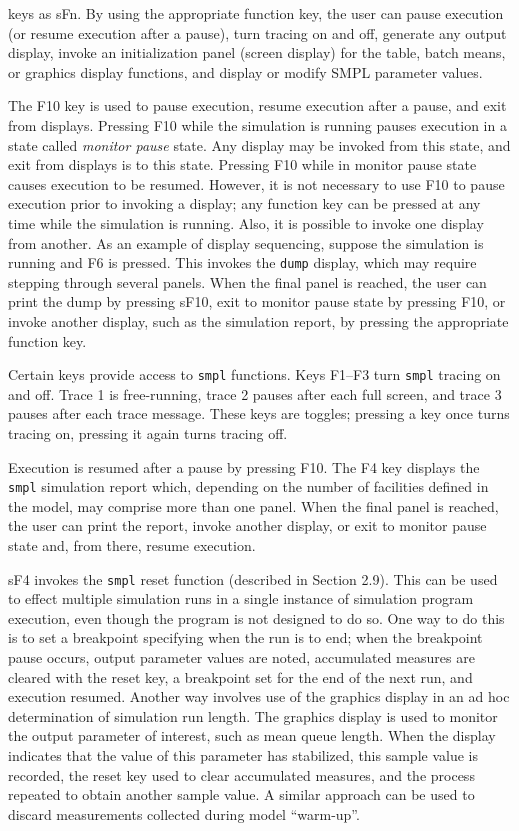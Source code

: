 \noindent keys as sFn. By using the appropriate function key, the user can pause
execution (or resume execution after a pause), turn tracing on and off, generate
any output display, invoke an initialization panel (screen display) for the
table, batch means, or graphics display functions, and display or modify
SMPL parameter values.

The F10 key is used to pause execution, resume execution after a pause,
and exit from displays. Pressing F10 while the simulation is running pauses
execution in a state called \emph{monitor pause} state. Any display may be invoked
from this state, and exit from displays is to this state. Pressing F10 while in
monitor pause state causes execution to be resumed. However, it is not
necessary to use F10 to pause execution prior to invoking a display; any
function key can be pressed at any time while the simulation is running.
Also, it is possible to invoke one display from another. As an example of
display sequencing, suppose the simulation is running and F6 is pressed. This
invokes the \texttt{dump} display, which may require stepping through several
panels. When the final panel is reached, the user can print the dump by
pressing sF10, exit to monitor pause state by pressing F10, or invoke another
display, such as the simulation report, by pressing the appropriate function
key.

Certain keys provide access to \texttt{smpl} functions. Keys F1--F3 turn \texttt{smpl}
tracing on and off. Trace 1 is free-running, trace 2 pauses after each full
screen, and trace 3 pauses after each trace message. These keys are toggles;
pressing a key once turns tracing on, pressing it again turns tracing off.

\noindent Execution is resumed after a pause by pressing F10. The F4 key displays the
\texttt{smpl} simulation report which, depending on the number of facilities defined
in the model, may comprise more than one panel. When the final panel is
reached, the user can print the report, invoke another display, or exit to
monitor pause state and, from there, resume execution.

sF4 invokes the \texttt{smpl} reset function (described in Section 2.9). This can be
used to effect multiple simulation runs in a single instance of simulation
program execution, even though the program is not designed to do so. One
way to do this is to set a breakpoint specifying when the run is to end; when
the breakpoint pause occurs, output parameter values are noted, accumulated
measures are cleared with the reset key, a breakpoint set for the end of the
next run, and execution resumed. Another way involves use of the graphics
display in an ad hoc determination of simulation run length. The graphics
display is used to monitor the output parameter of interest, such as mean
queue length. When the display indicates that the value of this parameter
has stabilized, this sample value is recorded, the reset key used to clear
accumulated measures, and the process repeated to obtain another sample
value. A similar approach can be used to discard measurements collected
during model ``warm-up''.

